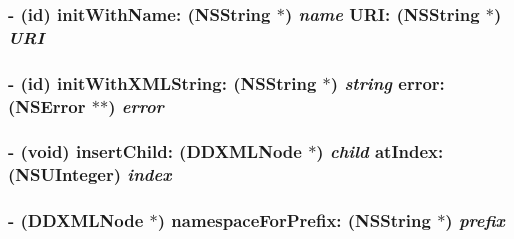 \label{class_d_d_x_m_l_element_a41737cd45eb9d25991217b46e30a0da5}
\hypertarget{class_d_d_x_m_l_element_a9b8b0cad05ffcf784d4799f6a657cca3}{
\subsubsection[{initWithName:URI:}]{\setlength{\rightskip}{0pt plus 5cm}-\/ (id) initWithName: ({\bf NSString} $\ast$) {\em name}\/ URI: ({\bf NSString} $\ast$) {\em URI}}}
\label{class_d_d_x_m_l_element_a9b8b0cad05ffcf784d4799f6a657cca3}
\hypertarget{class_d_d_x_m_l_element_a8dd59d3ce23a8c817482358862f5c78f}{
\subsubsection[{initWithXMLString:error:}]{\setlength{\rightskip}{0pt plus 5cm}-\/ (id) initWithXMLString: ({\bf NSString} $\ast$) {\em string}\/ error: (NSError $\ast$$\ast$) {\em error}}}
\label{class_d_d_x_m_l_element_a8dd59d3ce23a8c817482358862f5c78f}
\hypertarget{class_d_d_x_m_l_element_ab78a75bb3b6c2f3321bf4c8acb39b41d}{
\subsubsection[{insertChild:atIndex:}]{\setlength{\rightskip}{0pt plus 5cm}-\/ (void) insertChild: ({\bf DDXMLNode} $\ast$) {\em child}\/ atIndex: (NSUInteger) {\em index}}}
\label{class_d_d_x_m_l_element_ab78a75bb3b6c2f3321bf4c8acb39b41d}
\hypertarget{class_d_d_x_m_l_element_af104e0a24367ee5d80dc823ff1478fba}{
\subsubsection[{namespaceForPrefix:}]{\setlength{\rightskip}{0pt plus 5cm}-\/ ({\bf DDXMLNode} $\ast$) namespaceForPrefix: ({\bf NSString} $\ast$) {\em prefix}}}
\label{class_d_d_x_m_l_element_af104e0a24367ee5d80dc823ff1478fba}
